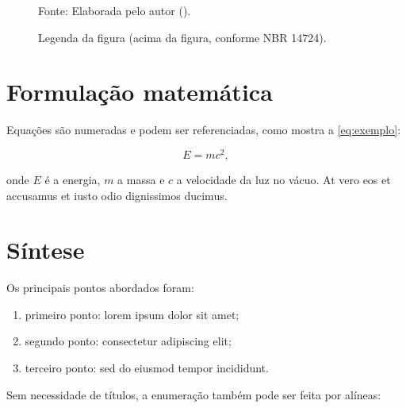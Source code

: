 \begin{figure}[!htb]
  \caption{Legenda da figura (acima da figura, conforme NBR 14724).}
  \label{fig:exemplo}
  \centering
    {Fonte: Elaborada pelo autor (\the\year{}).}
\end{figure}

\section{Formulação matemática}
\label{sec:formulacao}

Equações são numeradas e podem ser referenciadas, como mostra a
\autoref{eq:exemplo}:

\begin{equation}
  E = m c^{2},
  \label{eq:exemplo}
\end{equation}

\noindent onde $E$ é a energia, $m$ a massa e $c$ a velocidade da luz no vácuo.
At vero eos et accusamus et iusto odio dignissimos ducimus.

\section{Síntese}

Os principais pontos abordados foram:

\begin{enumerate}[label=(\roman*)]
  \item primeiro ponto: lorem ipsum dolor sit amet;
  \item segundo ponto: consectetur adipiscing elit;
  \item terceiro ponto: sed do eiusmod tempor incididunt.
\end{enumerate}

Sem necessidade de títulos, a enumeração também pode ser feita por alíneas:

